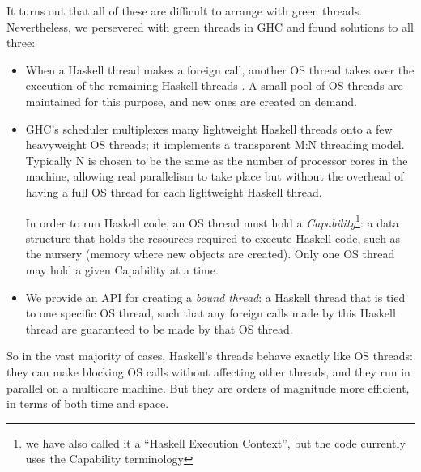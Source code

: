 \documentclass{article}
\let\cite=\citep
\begin{document}
{It turns out that all of these are difficult to arrange with green
threads.  Nevertheless, we persevered with green threads in GHC and
found solutions to all three:

\begin{itemize}
\item When a Haskell thread makes a foreign call, another OS thread
  takes over the execution of the remaining Haskell threads \cite{concffi04}.  A small
  pool of OS threads are maintained for this purpose, and new ones are
  created on demand.

\item GHC's scheduler multiplexes many lightweight Haskell threads
  onto a few heavyweight OS threads; it implements a transparent M:N
  threading model.  Typically N is chosen to be the same as the number
  of processor cores in the machine, allowing real parallelism to take
  place but without the overhead of having a full OS thread for each
  lightweight Haskell thread.

  In order to run Haskell code, an OS thread must hold a
  \emph{Capability}\footnote{we have also called it a ``Haskell
    Execution Context'', but the code currently uses the Capability
    terminology}: a data structure that holds the resources required
  to execute Haskell code, such as the nursery (memory where new
  objects are created).  Only one OS thread may hold a given
  Capability at a time.

\item We provide an API for creating a \emph{bound thread}: a Haskell
  thread that is tied to one specific OS thread, such that any foreign
  calls made by this Haskell thread are guaranteed to be made by that
  OS thread.
\end{itemize}

So in the vast majority of cases, Haskell's threads behave exactly
like OS threads: they can make blocking OS calls without affecting
other threads, and they run in parallel on a multicore machine.  But
they are orders of magnitude more efficient, in terms of both time and
space.

}
\end{document}
